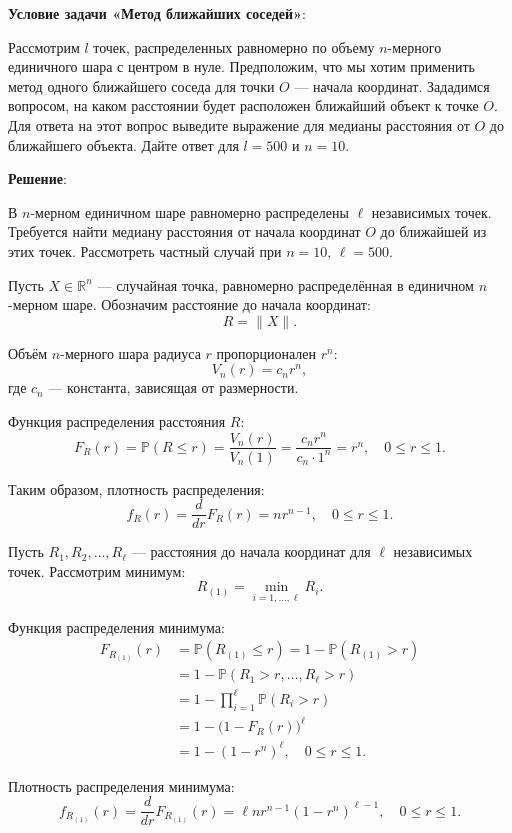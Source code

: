 \documentclass[pract]{SCWorks}
\begin{document}
    \textbf{Условие задачи «Метод ближайших соседей»}:

    Рассмотрим $l$ точек, распределенных равномерно по объему $n$-мерного единичного шара с центром в нуле.
    Предположим, что мы хотим применить метод одного ближайшего соседа для точки $O$ — начала координат.
    Зададимся вопросом, на каком расстоянии будет расположен ближайший объект к точке $O$.
    Для ответа на этот вопрос выведите выражение для медианы расстояния от $O$ до ближайшего объекта.
    Дайте ответ для $l = 500$ и $n = 10$.

    \textbf{Решение}:

    В $n$-мерном единичном шаре равномерно распределены $\ell$ независимых точек.
    Требуется найти медиану расстояния от начала координат $O$ до ближайшей из этих точек.
    Рассмотреть частный случай при $n=10$, $\ell=500$.

    Пусть $X \in \mathbb{R}^n$ — случайная точка, равномерно распределённая в единичном $n$-мерном шаре.
    Обозначим расстояние до начала координат:
    \[
    R = \|X\|.
    \]

    Объём $n$-мерного шара радиуса $r$ пропорционален $r^n$:
    \[
    V_n(r) = c_n r^n,
    \]
    где $c_n$ — константа, зависящая от размерности.

    Функция распределения расстояния $R$:
    \[
    F_R(r) = \mathbb{P}(R \le r) = \frac{V_n(r)}{V_n(1)} = \frac{c_n r^n}{c_n \cdot 1^n} = r^n, \quad 0 \le r \le 1.
    \]

    Таким образом, плотность распределения:
    \[
    f_R(r) = \frac{d}{dr} F_R(r) = n r^{n-1}, \quad 0 \le r \le 1.
    \]

    Пусть $R_1, R_2, \dots, R_\ell$ — расстояния до начала координат для $\ell$ независимых точек.
    Рассмотрим минимум:
    \[
    R_{(1)} = \min_{i=1,\dots,\ell} R_i.
    \]

    Функция распределения минимума:
    \[
    \begin{aligned}
    F_{R_{(1)}}(r) &= \mathbb{P}(R_{(1)} \le r) = 1 - \mathbb{P}(R_{(1)} > r) \\
    &= 1 - \mathbb{P}(R_1 > r, \dots, R_\ell > r) \\
    &= 1 - \prod_{i=1}^{\ell} \mathbb{P}(R_i > r) \\
    &= 1 - \bigl(1 - F_R(r)\bigr)^{\ell} \\
    &= 1 - (1 - r^n)^{\ell}, \quad 0 \le r \le 1.
    \end{aligned}
    \]

    Плотность распределения минимума:
    \[
    f_{R_{(1)}}(r) = \frac{d}{dr} F_{R_{(1)}}(r) = \ell n r^{n-1} (1 - r^n)^{\ell-1}, \quad 0 \le r \le 1.
    \]
\end{document}
